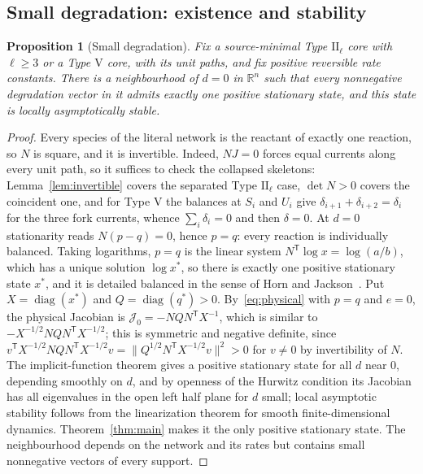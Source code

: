 \documentclass[11pt,a4paper]{article}
\theoremstyle{plain}
\newtheorem{proposition}[theorem]{Proposition}
\theoremstyle{definition}
\theoremstyle{remark}
\numberwithin{equation}{section}
\newcommand{\R}{\mathbb{R}}
\newcommand{\diag}{\operatorname{diag}}
\newcommand{\II}{\mathrm{II}}
\newcommand{\V}{\mathrm{V}}
\begin{document}
\subsection{Small degradation: existence and stability}

\begin{proposition}[Small degradation]\label{prop:small}
Fix a source-minimal Type $\II_\ell$ core with $\ell\ge3$ or a Type $\V$ core, with its unit paths, and fix positive reversible rate constants. There is a neighbourhood of $d=0$ in $\R^n$ such that every nonnegative degradation vector in it admits exactly one positive stationary state, and this state is locally asymptotically stable.
\end{proposition}

\begin{proof}
Every species of the literal network is the reactant of exactly one reaction, so $N$ is square, and it is invertible. Indeed, $NJ=0$ forces equal currents along every unit path, so it suffices to check the collapsed skeletons: Lemma~\ref{lem:invertible} covers the separated Type $\II_\ell$ case, $\det N>0$ covers the coincident one, and for Type $\V$ the balances at $S_i$ and $U_i$ give $\delta_{i+1}+\delta_{i+2}=\delta_i$ for the three fork currents, whence $\sum_i\delta_i=0$ and then $\delta=0$. At $d=0$ stationarity reads $N(p-q)=0$, hence $p=q$: every reaction is individually balanced. Taking logarithms, $p=q$ is the linear system $N^{\mathsf T}\log x=\log(a/b)$, which has a unique solution $\log x^*$, so there is exactly one positive stationary state $x^*$, and it is detailed balanced in the sense of Horn and Jackson~\cite{HJ72}. Put $X=\diag(x^*)$ and $Q=\diag(q^*)>0$. By~\eqref{eq:physical} with $p=q$ and $e=0$, the physical Jacobian is $\mathcal J_0=-NQN^{\mathsf T}X^{-1}$, which is similar to $-X^{-1/2}NQN^{\mathsf T}X^{-1/2}$; this is symmetric and negative definite, since $v^{\mathsf T}X^{-1/2}NQN^{\mathsf T}X^{-1/2}v=\|Q^{1/2}N^{\mathsf T}X^{-1/2}v\|^2>0$ for $v\ne0$ by invertibility of $N$. The implicit-function theorem gives a positive stationary state for all $d$ near $0$, depending smoothly on $d$, and by openness of the Hurwitz condition its Jacobian has all eigenvalues in the open left half plane for $d$ small; local asymptotic stability follows from the linearization theorem for smooth finite-dimensional dynamics. Theorem~\ref{thm:main} makes it the only positive stationary state. The neighbourhood depends on the network and its rates but contains small nonnegative vectors of every support.
\end{proof}
\end{document}

